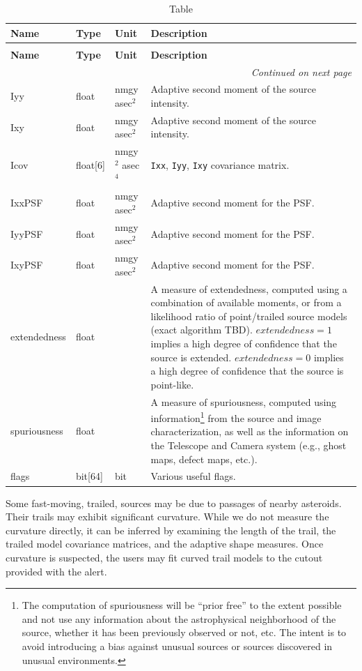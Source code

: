 \documentclass[SE,lsstdraft,toc]{lsstdoc}
\newcommand{\oldtext}[1]{{\color{red} #1}}
\newenvironment{schema}[3]{%
\setlength\LTleft{0pt}
\setlength\LTright{\fill}
\begin{longtable}{p{0.2\textwidth}p{0.14\textwidth}p{0.14\textwidth}p{0.41\textwidth}}

\caption[#1]{#2\label{#3}}\\

\hline \textbf{Name} & \textbf{Type} & \textbf{Unit} & \textbf{Description}\\ \hline
\endfirsthead

\caption[#1]{#2}\\

\hline \textbf{Name} & \textbf{Type} & \textbf{Unit} & \textbf{Description}\\ \hline
\endhead

\hline \multicolumn{4}{r}{\emph{Continued on next page}} \\
\endfoot

\hline\hline
\endlastfoot
}{%
\hline
\end{longtable}
}
\begin{document}
\begin{schema}{\DIASource Table}{\DIASource Table}{tbl:diasourceTable}
Iyy & float & \oldtext{nmgy} asec$^{2}$ & Adaptive second moment of the source intensity. \\

Ixy & float & \oldtext{nmgy} asec$^{2}$ & Adaptive second moment of the source intensity. \\

Icov & float[6] & \oldtext{nmgy$^{2}$} asec$^{4}$ & \texttt{Ixx}, \texttt{Iyy}, \texttt{Ixy} covariance matrix. \\

IxxPSF & float & \oldtext{nmgy} asec$^{2}$ & Adaptive second moment for the PSF. \\

IyyPSF & float & \oldtext{nmgy} asec$^{2}$ & Adaptive second moment for the PSF. \\

IxyPSF & float & \oldtext{nmgy} asec$^{2}$ & Adaptive second moment for the PSF. \\

extendedness & float & ~ & A measure of extendedness, computed using a combination of available moments, or from a likelihood ratio of point/trailed source models (exact algorithm TBD). $extendedness=1$ implies a high degree of confidence that the source is extended. $extendedness=0$ implies a high degree of confidence that the source is point-like. \\

spuriousness & float & ~ & A measure of spuriousness, computed using information\footnote{The computation
of spuriousness will be “prior free” to the extent possible and not use any information about the astrophysical neighborhood of the source, whether it has been previously observed or not, etc. The intent is to avoid introducing
a bias against unusual sources or sources discovered in unusual environments.}
from the source and image characterization, as well as the information on the Telescope and Camera system
(e.g., ghost maps, defect maps, etc.).
\\

flags & bit[64] & bit & Various useful flags.  \\
\end{schema}

Some fast-moving, trailed, sources may be due to passages of nearby asteroids. Their trails may exhibit significant curvature.
While we do not measure the curvature directly, it can be inferred by examining the length of the trail, the trailed model covariance matrices, and the adaptive shape measures. Once curvature is suspected, the users may fit curved trail models to the cutout provided with the alert.
\end{document}
